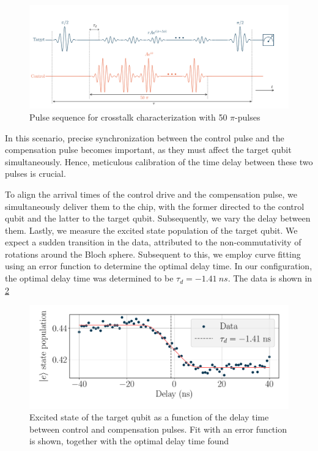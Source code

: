 \begin{figure}
    \centering
    \includegraphics[width=0.95\linewidth]{Images//Chap2.0/diagram_gaussian.pdf}
    \vspace{-0.3cm}
    \caption{Pulse sequence for crosstalk characterization with 50 $\pi$-pulses}
    \label{fig:train_gauss}
\end{figure}

In this scenario, precise synchronization between the control pulse and the compensation pulse becomes important, as they must affect the target qubit simultaneously.
Hence, meticulous calibration of the time delay between these two pulses is crucial.

To align the arrival times of the control drive and the compensation pulse, we simultaneously deliver them to the chip, with the former directed to the control qubit and the latter to the target qubit.
Subsequently, we vary the delay between them.
Lastly, we measure the excited state population of the target qubit.
We expect a sudden transition in the data, attributed to the non-commutativity of rotations around the Bloch sphere.
Subsequent to this, we employ curve fitting using an error function to determine the optimal delay time.
In our configuration, the optimal delay time was determined to be $\tau_d = \SI{-1.41}{ns}$.
The data is shown in \cref{fig:delay}

\begin{figure}[b!]
    \centering
    \includegraphics[width=0.8\linewidth]{Images//Chap2.0/delay.pdf}
    \vspace{-0.5cm}
    \caption{Excited state of the target qubit as a function of the delay time between control and compensation pulses. Fit with an error function is shown, together with the optimal delay time found}
    \label{fig:delay}
\end{figure}

